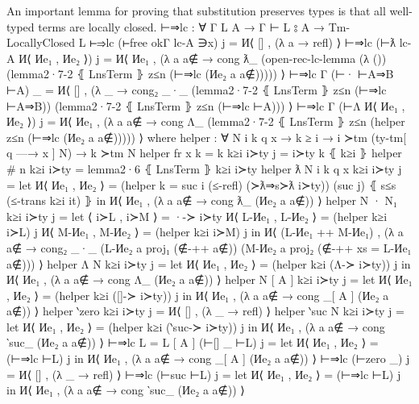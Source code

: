 \documentclass[logo,bsc,singlespacing,parskip,online]{infthesis}
\renewenvironment{code}{\mintedcopy[breaklines,breaksymbolleft=\;]{agda}}{\endmintedcopy}
\begin{document}
An important lemma for proving that substitution preserves types is that all well-typed terms are
locally closed.
\begin{code}
  ⊢⇒lc : ∀ {Γ L A} → Γ ⊢ L ⦂ A → Tm-LocallyClosed L
  ⊢⇒lc (⊢free okΓ lc-A ∋x) j = И⟨ [] , (λ a → refl) ⟩
  ⊢⇒lc (⊢ƛ lc-A И⟨ Иe₁ , Иe₂ ⟩) j = И⟨ Иe₁ , (λ a {a∉} → cong ƛ_
    (open-rec-lc-lemma
      (λ ())
      (lemma2·7-2 ⦃ LnsTerm ⦄ z≤n (⊢⇒lc (Иe₂ a {a∉}))))) ⟩
  ⊢⇒lc {Γ} (⊢· ⊢A⇒B ⊢A) _ = И⟨ [] , (λ _ → cong₂ _·_
    (lemma2·7-2 ⦃ LnsTerm ⦄ z≤n (⊢⇒lc ⊢A⇒B))
    (lemma2·7-2 ⦃ LnsTerm ⦄ z≤n (⊢⇒lc ⊢A))) ⟩
  ⊢⇒lc {Γ} (⊢Λ И⟨ Иe₁ , Иe₂ ⟩) j = И⟨ Иe₁ , (λ a {a∉} → cong Λ_ (lemma2·7-2 ⦃ LnsTerm ⦄ z≤n (helper z≤n (⊢⇒lc (Иe₂ a {a∉}))))) ⟩
    where
      helper : ∀ {N i k q x}
        → k ≥ i
        → i ≻tm (ty-tm[ q —→ x ] N)
        → k ≻tm N
      helper {fr x} {k = k} k≥i i≻ty j = i≻ty k ⦃ k≥i ⦄
      helper {# n} k≥i i≻ty = lemma2·6 ⦃ LnsTerm ⦄ k≥i i≻ty
      helper {ƛ N} {i} {k} {q} {x} k≥i i≻ty j =
        let И⟨ Иe₁ , Иe₂ ⟩ = (helper {k = suc i} (≤-refl) (≻ƛ⇒s≻ƛ i≻ty)) (suc j) ⦃ s≤s (≤-trans k≥i it) ⦄
        in И⟨ Иe₁ , (λ a {a∉} → cong ƛ_ (Иe₂ a {a∉})) ⟩
      helper {N · N₁} k≥i i≻ty j =
        let ⟨ i≻L  , i≻M ⟩ = ·-≻ i≻ty
            И⟨ L-Иe₁ , L-Иe₂ ⟩ = (helper k≥i i≻L) j
            И⟨ M-Иe₁ , M-Иe₂ ⟩ = (helper k≥i i≻M) j
          in И⟨ (L-Иe₁ ++ M-Иe₁) , (λ a {a∉} → cong₂ _·_
            (L-Иe₂ a {proj₁ (∉-++ a∉)})
            (M-Иe₂ a {proj₂ (∉-++ {xs = L-Иe₁} a∉)})) ⟩
      helper {Λ N} k≥i i≻ty j =
        let И⟨ Иe₁ , Иe₂ ⟩ = (helper k≥i (Λ-≻ i≻ty)) j
        in И⟨ Иe₁ , (λ a {a∉} → cong Λ_ (Иe₂ a {a∉})) ⟩
      helper {N [ A ]} k≥i i≻ty j =
        let И⟨ Иe₁ , Иe₂ ⟩ = (helper k≥i ([]-≻ i≻ty)) j
        in И⟨ Иe₁ , (λ a {a∉} → cong _[ A ] (Иe₂ a {a∉})) ⟩
      helper {‵zero} k≥i i≻ty j = И⟨ [] , (λ _ → refl) ⟩
      helper {‵suc N} k≥i i≻ty j =
        let И⟨ Иe₁ , Иe₂ ⟩ = (helper k≥i (‵suc-≻ i≻ty)) j
        in И⟨ Иe₁ , (λ a {a∉} → cong ‵suc_ (Иe₂ a {a∉})) ⟩
  ⊢⇒lc {L = L [ A ]} (⊢[] _ ⊢L) j =
    let И⟨ Иe₁ , Иe₂ ⟩ = (⊢⇒lc ⊢L) j
    in И⟨ Иe₁ , (λ a {a∉} → cong _[ A ]  (Иe₂ a {a∉})) ⟩
  ⊢⇒lc (⊢zero _) j = И⟨ [] , (λ _ → refl) ⟩
  ⊢⇒lc (⊢suc ⊢L) j =
    let И⟨ Иe₁ , Иe₂ ⟩ = (⊢⇒lc ⊢L) j
    in И⟨ Иe₁ , (λ a {a∉} → cong ‵suc_ (Иe₂ a {a∉})) ⟩


\end{code}
\end{document}
